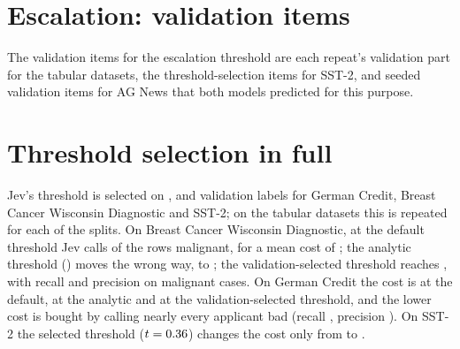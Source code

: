 \section{Escalation: validation items}
\label{app:escalation}

The validation items for the escalation threshold are each repeat's validation part for the
tabular datasets, the \EscValLabelsSst{} threshold-selection items for SST-2, and
\EscValItemsNew{} seeded validation items for AG News that both models predicted for this
purpose.


\section{Threshold selection in full}
\label{app:thresholds}

Jev's threshold is selected on \ThrValLabelsJevGerman, \ThrValLabelsJevWdbc{} and
\ThrValLabelsJevSst{} validation labels for German Credit, Breast Cancer Wisconsin Diagnostic
and SST-2; on the tabular datasets this is repeated for each of the \NRepeats{} splits. On
Breast Cancer Wisconsin Diagnostic, at the default threshold Jev calls
\PredictedPositiveJevWdbc{} of the rows malignant, for a mean cost of
\ThrMeanCostDefaultJevWdbc; the analytic threshold (\ThresholdAnalyticJevWdbc) moves the wrong
way, to \ThrMeanCostAnalyticJevWdbc; the validation-selected threshold reaches
\ThrMeanCostValidationJevWdbc, with recall \ThrRecallValidationJevWdbc{} and precision
\ThrPrecisionValidationJevWdbc{} on malignant cases. On German Credit the cost is
\ThrMeanCostDefaultJevGerman{} at the default, \ThrMeanCostAnalyticJevGerman{} at the analytic and
\ThrMeanCostValidationJevGerman{} at the validation-selected threshold, and the lower cost is
bought by calling nearly every applicant bad (recall \ThrRecallValidationJevGerman, precision
\ThrPrecisionValidationJevGerman). On SST-2 the selected threshold
($t = 0.36$) changes the cost only from \ThrMeanCostDefaultJevSst{} to
\ThrMeanCostValidationJevSst.


\begin{table}[H]
  \caption{Decisions at three thresholds on P(positive) for every model. Positive classes: bad
    (German Credit), malignant (Breast Cancer Wisconsin), positive (SST-2). Tabular values are
    means $\pm$ standard deviations over \NRepeats{} split repeats, and $t$ is the mean
    threshold. Costs: \CostRatioGerman{} (canonical), \CostRatioWdbc{} (illustrative),
    \CostRatioSst{} (illustrative).}
  \label{tab:thresholds-all}
  \centering\scriptsize
  \setlength{\tabcolsep}{3.5pt}
  \fittable{}
\end{table}

